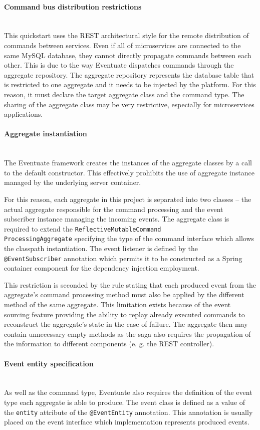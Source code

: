 \documentclass[oneside,
  digital, %
  table,   %
  nolof,     %
  nolot,     %
]{fithesis3}
\newcommand{\newlinepar}[1]{\paragraph{#1}\needspace{4\baselineskip}\mbox{}\\}
\begin{document}
\newlinepar{Command bus distribution restrictions}

This quickstart uses the REST architectural style for the remote distribution of commands between services. Even if all of microservices are connected to the same MySQL database, they cannot directly propagate commands between each other. This is due to the way Eventuate dispatches commands through the aggregate repository. The aggregate repository represents the database table that is restricted to one aggregate and it needs to be injected by the platform. For this reason, it must declare the target aggregate class and the command type. The sharing of the aggregate class may be very restrictive, especially for microservices applications.

\newlinepar{Aggregate instantiation}

The Eventuate framework creates the instances of the aggregate classes by a call to the default constructor. This effectively prohibits the use of aggregate instance managed by the underlying server container. 

For this reason, each aggregate in this project is separated into two classes -- the actual aggregate responsible for the command processing and the event subscriber instance managing the incoming events. The  aggregate class is required to extend the \texttt{ReflectiveMutableCommand\\ProcessingAggregate} specifying the type of the command interface which allows the classpath instantiation. The event listener is defined by the \texttt{@EventSubscriber} annotation which permits it to be constructed as a Spring container component for the dependency injection employment. 

This restriction is seconded by the rule stating that each produced event from the aggregate's command processing method must also be applied by the different method of the same aggregate. This limitation exists because of the event sourcing feature providing the ability to replay already executed commands to reconstruct the aggregate's state in the case of failure. The aggregate then may contain unnecessary empty methods as the saga also requires the propagation of the information to different components (e. g. the REST controller).


\newlinepar{Event entity specification}

As well as the command type, Eventuate also requires the definition of the event type each aggregate is able to produce. The event class is defined as a value of the \texttt{entity} attribute of the \texttt{@EventEntity} annotation. This annotation is usually placed on the event interface which implementation represents produced events.
\end{document}
